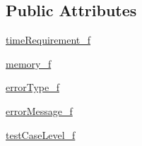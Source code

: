 \subsection*{Public Attributes}
\begin{DoxyCompactItemize}
\item 
\hyperlink{class_ecodena_1_1_attempt_1_1models_1_1_error_report_ab3b846491a8aa2fa4135ed71f0eedfd0}{timeRequirement\_\-f}
\item 
\hyperlink{class_ecodena_1_1_attempt_1_1models_1_1_error_report_a858275b05dc21b8b755b3b393ad38fb7}{memory\_\-f}
\item 
\hyperlink{class_ecodena_1_1_attempt_1_1models_1_1_error_report_af26b1061aca87017c2a7297692ad08ac}{errorType\_\-f}
\item 
\hyperlink{class_ecodena_1_1_attempt_1_1models_1_1_error_report_a5fbebb2285d654535fc28825c477af65}{errorMessage\_\-f}
\item 
\hyperlink{class_ecodena_1_1_attempt_1_1models_1_1_error_report_ad6bef1ac293f3dd474cc47975aa77be2}{testCaseLevel\_\-f}
\end{DoxyCompactItemize}
